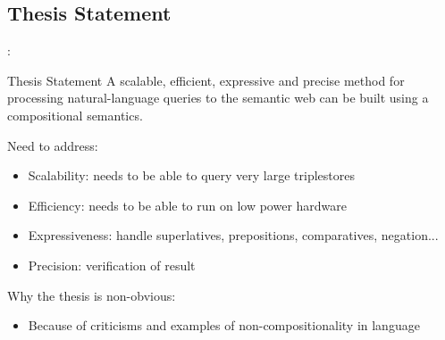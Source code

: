 \documentclass[logoontitle,tabu,supertabular,aspectratio=43]{preney-uwindsor-beamer}
\begin{document}




    \subsection{Thesis Statement}
    \begin{frame}{\insertsection: \insertsubsection}
        \begin{block}{Thesis Statement}
            A scalable, efficient, expressive and precise method for processing natural-language queries to the semantic web can be built using a compositional semantics.
        \end{block}

        Need to address:
        \begin{itemize}
            \item Scalability: needs to be able to query very large triplestores
            \item Efficiency: needs to be able to run on low power hardware
            \item Expressiveness: handle superlatives, prepositions, comparatives, negation...
            \item Precision: verification of result
        \end{itemize}

        Why the thesis is non-obvious:
        \begin{itemize}
            \item Because of criticisms and examples of non-compositionality in language
        \end{itemize}
    \end{frame}

\end{document}

